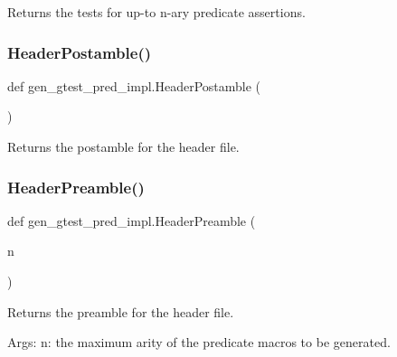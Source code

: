 \begin{DoxyVerb}Returns the tests for up-to n-ary predicate assertions.\end{DoxyVerb}
 \mbox{\label{namespacegen__gtest__pred__impl_a3d40c7ef70cf4d46e56c9612f34027bf}} 
\subsubsection{\texorpdfstring{HeaderPostamble()}{HeaderPostamble()}}
{\footnotesize\ttfamily def gen\+\_\+gtest\+\_\+pred\+\_\+impl.\+Header\+Postamble (\begin{DoxyParamCaption}{ }\end{DoxyParamCaption})}

\begin{DoxyVerb}Returns the postamble for the header file.\end{DoxyVerb}
 \mbox{\label{namespacegen__gtest__pred__impl_a0b99cadcffab4bf161654a382163bac8}} 
\subsubsection{\texorpdfstring{HeaderPreamble()}{HeaderPreamble()}}
{\footnotesize\ttfamily def gen\+\_\+gtest\+\_\+pred\+\_\+impl.\+Header\+Preamble (\begin{DoxyParamCaption}\item[{}]{n }\end{DoxyParamCaption})}

\begin{DoxyVerb}Returns the preamble for the header file.

Args:
  n:  the maximum arity of the predicate macros to be generated.
\end{DoxyVerb}
 \mbox{\label{namespacegen__gtest__pred__impl_a8c53b141b89f9c05d0131d9756dfeab0}} 
